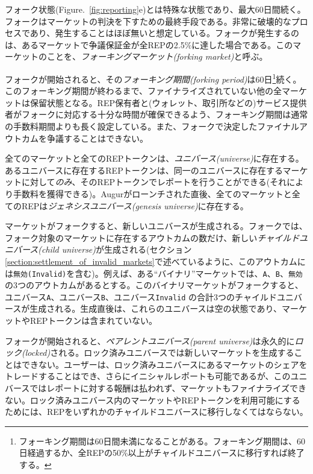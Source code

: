 \documentclass[floatfix,reprint,nofootinbib,amsmath,amssymb,epsfig,pre,floats,letterpaper,groupedaffiliation]{revtex4-1}
\theoremstyle{definition}
\theoremstyle{definition}
\theoremstyle{definition}
\begin{document}
フォーク状態(Figure.~\ref{fig:reporting}e)とは特殊な状態であり、最大60日間続く。フォークはマーケットの判決を下すための最終手段である。非常に破壊的なプロセスであり、発生することはほぼ無いと想定している。フォークが発生するのは、あるマーケットで争議保証金が全REPの2.5\%に達した場合である。このマーケットのことを、\textit{フォーキングマーケット(forking market)}と呼ぶ。

フォークが開始されると、その\textit{フォーキング期間(forking period)}は60日\footnote{フォーキング期間は60日間未満になることがある。フォーキング期間は、60日経過するか、全REPの50\%以上がチャイルドユニバースに移行すれば終了する。}続く。このフォーキング期間が終わるまで、ファイナライズされていない他の全マーケットは保留状態となる。REP保有者と(ウォレット、取引所などの)サービス提供者がフォークに対応する十分な時間が確保できるよう、フォーキング期間は通常の手数料期間よりも長く設定している。また、フォークで決定したファイナルアウトカムを争議することはできない。

全てのマーケットと全てのREPトークンは、\textit{ユニバース(universe)}に存在する。あるユニバースに存在するREPトークンは、同一のユニバースに存在するマーケットに対して\textit{のみ}、そのREPトークンでレポートを行うことができる(それにより手数料を獲得できる)。Augurがローンチされた直後、全てのマーケットと全てのREPは\textit{ジェネシスユニバース(genesis universe)}に存在する。

マーケットがフォークすると、新しいユニバースが生成される。フォークでは、フォーク対象のマーケットに存在するアウトカムの数だけ、新しい\textit{チャイルドユニバース(child universe)}が生成される(セクション\ref{section:settlement_of_invalid_markets}で述べているように、このアウトカムには\texttt{無効(Invalid)}を含む)。例えば、ある“バイナリ”マーケットでは、\texttt{A}、\texttt{B}、\texttt{無効}の3つのアウトカムがあるとする。このバイナリマーケットがフォークすると、ユニバース\texttt{A}、ユニバース\texttt{B}、ユニバース\texttt{Invalid} の合計3つのチャイルドユニバースが生成される。生成直後は、これらのユニバースは空の状態であり、マーケットやREPトークンは含まれていない。

フォークが開始されると、\textit{ペアレントユニバース(parent universe)}は永久的に\textit{ロック(locked)}される。ロック済みユニバースでは新しいマーケットを生成することはできない。ユーザーは、ロック済みユニバースにあるマーケットのシェアをトレードすることはでき、さらにイニシャルレポートも可能であるが、このユニバースではレポートに対する報酬は払われず、マーケットもファイナライズできない。ロック済みユニバース内のマーケットやREPトークンを利用可能にするためには、REPをいずれかのチャイルドユニバースに移行しなくてはならない。
\end{document}
